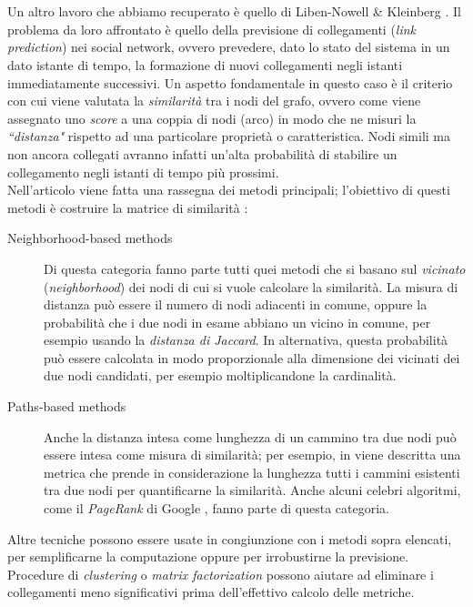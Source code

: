 \documentclass[a4paper,12pt]{article}
\begin{document}
\\
\\
Un altro lavoro che abbiamo recuperato è quello di Liben-Nowell \& Kleinberg \cite{link}. Il problema da loro affrontato è quello della previsione di collegamenti (\textit{link prediction}) nei social network, ovvero prevedere, dato lo stato del sistema in un dato istante di tempo, la formazione di nuovi collegamenti negli istanti immediatamente successivi. Un aspetto fondamentale in questo caso è il criterio con cui viene valutata la \textit{similarità} tra i nodi del grafo, ovvero come viene assegnato uno \textit{score} a una coppia di nodi (arco) in modo che ne misuri la \textit{``distanza"} rispetto ad una particolare proprietà o caratteristica. Nodi simili ma non ancora collegati avranno infatti un'alta probabilità di stabilire un collegamento negli istanti di tempo più prossimi. \\
Nell'articolo viene fatta una rassegna dei metodi principali; l'obiettivo di questi metodi è costruire la matrice di similarità :
\begin{description}
\item[Neighborhood-based methods] Di questa categoria fanno parte tutti quei metodi che si basano sul \textit{vicinato} (\textit{neighborhood}) dei nodi di cui si vuole calcolare la similarità. La misura di distanza può essere il numero di nodi adiacenti in comune, oppure la probabilità che i due nodi in esame abbiano un vicino in comune, per esempio usando la \textit{distanza di Jaccard}. In alternativa, questa probabilità può essere calcolata in modo proporzionale alla dimensione dei vicinati dei due nodi candidati, per esempio moltiplicandone la cardinalità.
\item[Paths-based methods] Anche la distanza intesa come lunghezza di un cammino tra due nodi può essere intesa come misura di similarità; per esempio, in \cite{katz} viene descritta una metrica che prende in considerazione la lunghezza tutti i cammini esistenti tra due nodi per quantificarne la similarità. Anche alcuni celebri algoritmi, come il \textit{PageRank} di Google \cite{google}, fanno parte di questa categoria.
\end{description}
Altre tecniche possono essere usate in congiunzione con i metodi sopra elencati, per semplificarne la computazione oppure per irrobustirne la previsione. Procedure di \textit{clustering} o \textit{matrix factorization} possono aiutare ad eliminare i collegamenti meno significativi prima dell'effettivo calcolo delle metriche. \\
\end{document}
